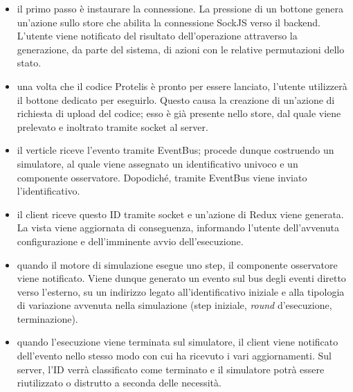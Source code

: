       \begin{itemize}
        \item
          il primo passo è instaurare la connessione.
          La pressione di un bottone genera un'azione sullo store che abilita la connessione SockJS verso il backend.
          L'utente viene notificato del risultato dell'operazione attraverso la generazione, da parte del sistema, di azioni con le relative permutazioni dello stato.
        \item
          una volta che il codice Protelis è pronto per essere lanciato, l'utente utilizzerà il bottone dedicato per eseguirlo.
          Questo causa la creazione di un'azione di richiesta di upload del codice;
          esso è già presente nello store, dal quale viene prelevato e inoltrato tramite socket al server.
        \item
          il verticle riceve l'evento tramite EventBus;
          procede dunque costruendo un simulatore, al quale viene assegnato un identificativo univoco e un componente osservatore.
          Dopodiché, tramite EventBus viene inviato l'identificativo.
        \item
          il client riceve questo ID tramite socket e un'azione di Redux viene generata.
          La vista viene aggiornata di conseguenza, informando l'utente dell'avvenuta configurazione e dell'imminente avvio dell'esecuzione.
        \item
          quando il motore di simulazione esegue uno step, il componente osservatore viene notificato.
          Viene dunque generato un evento sul bus degli eventi diretto verso l'esterno, su un indirizzo legato all'identificativo iniziale e alla tipologia di variazione avvenuta nella simulazione (step iniziale, \emph{round} d'esecuzione, terminazione).
        \item
          quando l'esecuzione viene terminata sul simulatore, il client viene notificato dell'evento nello stesso modo con cui ha ricevuto i vari aggiornamenti.
          Sul server, l'ID verrà classificato come terminato e il simulatore potrà essere riutilizzato o distrutto a seconda delle necessità.
      \end{itemize}

